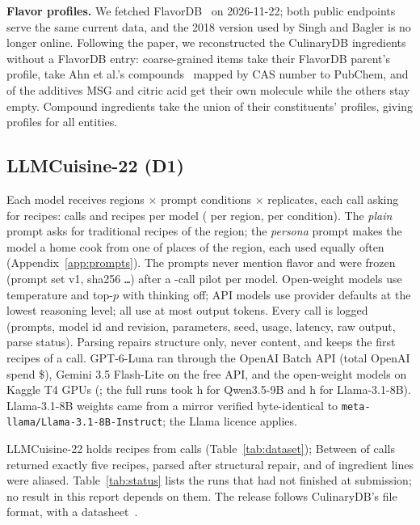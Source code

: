\documentclass[conference]{IEEEtran}
\begin{document}
\textbf{Flavor profiles.} We fetched FlavorDB~\cite{garg2018} on 2026-11-22; both public endpoints serve the same current data, and the 2018 version used by Singh and Bagler is no longer online. Following the paper, we reconstructed the \NMissingProfiles{} CulinaryDB ingredients without a FlavorDB entry: \NMissingCoarse{} coarse-grained items take their FlavorDB parent's profile, \NAhnNames{} take Ahn et al.'s compounds~\cite{ahn2011} mapped by CAS number to PubChem, and of the \NMissingAdditives{} additives MSG and citric acid get their own molecule while the others stay empty. Compound ingredients take the union of their constituents' profiles, giving profiles for all \NCdbEntities{} entities.

\subsection{LLMCuisine-22 (D1)}
Each model receives \NRegions{} regions $\times$ \NConditionsWord{} prompt conditions $\times$ \NReplicates{} replicates, each call asking for \NRecipesPerCallWord{} recipes: \NCallsPerModel{} calls and \NRecipesPerModel{} recipes per model (\NRecipesPerRegionModel{} per region, \NRecipesPerCondition{} per condition). The \emph{plain} prompt asks for traditional recipes of the region; the \emph{persona} prompt makes the model a home cook from one of \NPersonaPlaces{} places of the region, each used equally often (Appendix~\ref{app:prompts}). The prompts never mention flavor and were frozen (prompt set v1, sha256 \texttt{\NPromptHash\ldots}) after a \NPilotCalls-call pilot per model. Open-weight models use temperature \NTemperature{} and top-$p$ \NTopP{} with thinking off; API models use provider defaults at the lowest reasoning level; all use at most \NMaxTokens{} output tokens. Every call is logged (prompts, model id and revision, parameters, seed, usage, latency, raw output, parse status). Parsing repairs structure only, never content, and keeps the first \NRecipesPerCallWord{} recipes of a call. GPT-6-Luna ran through the OpenAI Batch API (total OpenAI spend \$\NOpenAISpend), Gemini 3.5 Flash-Lite on the free API, and the open-weight models on Kaggle T4 GPUs (\NKaggleEngineText; the full runs took \NKaggleQwenHours{} h for Qwen3.5-9B and \NKaggleLlamaHours{} h for Llama-3.1-8B). Llama-3.1-8B weights came from a mirror verified byte-identical to \texttt{meta-llama/Llama-3.1-8B-Instruct}; the Llama licence applies.

LLMCuisine-22 holds \NRecipesTotal{} recipes from \NCallsTotal{} calls (Table~\ref{tab:dataset}); \NMeetsProposal{} Between \NExactFiveRange{} of calls returned exactly five recipes, \NParseAnyRange{} parsed after structural repair, and \NAliasMatchedRange{} of ingredient lines were aliased. Table~\ref{tab:status} lists the runs that had not finished at submission; no result in this report depends on them. The release follows CulinaryDB's file format, with a datasheet~\cite{gebru2021}.
\end{document}
